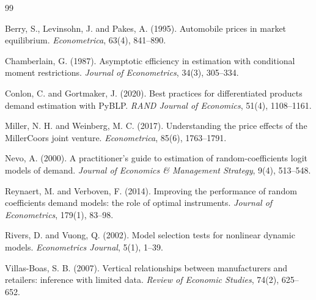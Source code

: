 \documentclass[11pt]{article}
\begin{document}
\begin{thebibliography}{99}

Berry, S., Levinsohn, J. and Pakes, A. (1995). Automobile prices in market equilibrium.
\emph{Econometrica}, 63(4), 841--890.

Chamberlain, G. (1987). Asymptotic efficiency in estimation with conditional moment
restrictions. \emph{Journal of Econometrics}, 34(3), 305--334.

Conlon, C. and Gortmaker, J. (2020). Best practices for differentiated products demand
estimation with PyBLP. \emph{RAND Journal of Economics}, 51(4), 1108--1161.

Miller, N. H. and Weinberg, M. C. (2017). Understanding the price effects of the MillerCoors
joint venture. \emph{Econometrica}, 85(6), 1763--1791.

Nevo, A. (2000). A practitioner's guide to estimation of random-coefficients logit models of
demand. \emph{Journal of Economics \& Management Strategy}, 9(4), 513--548.

Reynaert, M. and Verboven, F. (2014). Improving the performance of random coefficients demand
models: the role of optimal instruments. \emph{Journal of Econometrics}, 179(1), 83--98.

Rivers, D. and Vuong, Q. (2002). Model selection tests for nonlinear dynamic models.
\emph{Econometrics Journal}, 5(1), 1--39.

Villas-Boas, S. B. (2007). Vertical relationships between manufacturers and retailers:
inference with limited data. \emph{Review of Economic Studies}, 74(2), 625--652.

\end{thebibliography}
\end{document}
